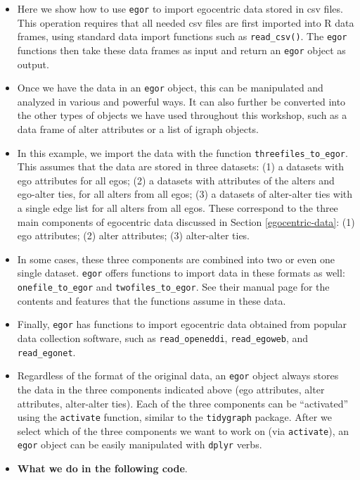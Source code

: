 \documentclass[
]{book}
\providecommand{\tightlist}{%
  \setlength{\itemsep}{0pt}\setlength{\parskip}{0pt}}
\begin{document}
\begin{itemize}
\tightlist
\item
  Here we show how to use \texttt{egor} to import egocentric data stored in csv files. This operation requires that all needed csv files are first imported into R data frames, using standard data import functions such as \texttt{read\_csv()}. The \texttt{egor} functions then take these data frames as input and return an \texttt{egor} object as output.
\item
  Once we have the data in an \texttt{egor} object, this can be manipulated and analyzed in various and powerful ways. It can also further be converted into the other types of objects we have used throughout this workshop, such as a data frame of alter attributes or a list of igraph objects.
\item
  In this example, we import the data with the function \texttt{threefiles\_to\_egor}. This assumes that the data are stored in three datasets: (1) a datasets with ego attributes for all egos; (2) a datasets with attributes of the alters and ego-alter ties, for all alters from all egos; (3) a datasets of alter-alter ties with a single edge list for all alters from all egos. These correspond to the three main components of egocentric data discussed in Section \ref{egocentric-data}: (1) ego attributes; (2) alter attributes; (3) alter-alter ties.
\item
  In some cases, these three components are combined into two or even one single dataset. \texttt{egor} offers functions to import data in these formats as well: \texttt{onefile\_to\_egor} and \texttt{twofiles\_to\_egor}. See their manual page for the contents and features that the functions assume in these data.
\item
  Finally, \texttt{egor} has functions to import egocentric data obtained from popular data collection software, such as \texttt{read\_openeddi}, \texttt{read\_egoweb}, and \texttt{read\_egonet}.
\item
  Regardless of the format of the original data, an \texttt{egor} object always stores the data in the three components indicated above (ego attributes, alter attributes, alter-alter ties). Each of the three components can be ``activated'' using the \texttt{activate} function, similar to the \texttt{tidygraph} package. After we select which of the three components we want to work on (via \texttt{activate}), an \texttt{egor} object can be easily manipulated with \texttt{dplyr} verbs.
\item
  \textbf{What we do in the following code}.


\end{itemize}
\end{document}
